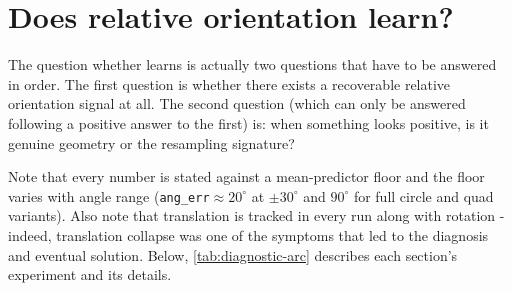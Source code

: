 \documentclass[final_report.tex]{subfiles}
\begin{document}
\section{Does relative orientation learn?}\label{sec:does-dphi-learn}
The question whether \dphi{} learns is actually two questions that have to be answered in order. The first question is whether there exists a recoverable relative orientation signal at all. The second question (which can only be answered following a positive answer to the first) is: when something looks positive, is it genuine geometry or the resampling signature?

Note that every number is stated against a mean-predictor floor and the floor varies with angle range (\texttt{ang\_err}$\approx 20^\circ$ at $\pm30^\circ$ and $90^\circ$ for full circle and quad variants). Also note that translation is tracked in every run along with rotation - indeed, translation collapse was one of the symptoms that led to the diagnosis and eventual solution. Below, \cref{tab:diagnostic-arc} describes each section's experiment and its details.
\end{document}
